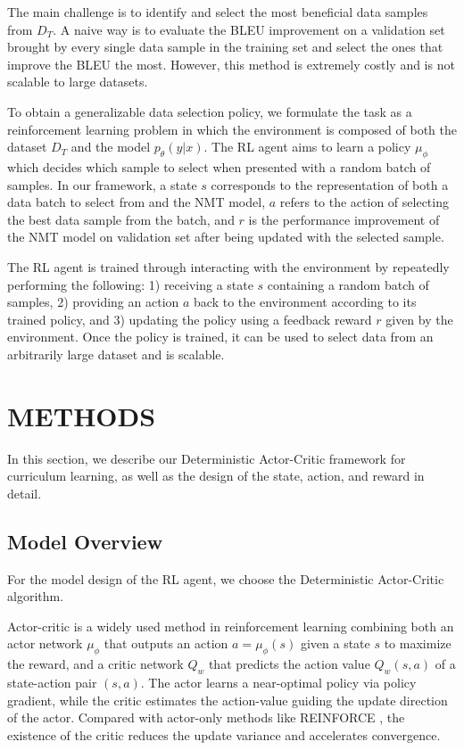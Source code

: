 \documentclass[letterpaper]{article}
\begin{document}
The main challenge is to identify and select the most beneficial data samples from $D_T$.
A naive way is to evaluate the BLEU improvement on a validation set brought by every single data sample in the training set and select the ones that improve the BLEU the most. However, this method is extremely costly and is not scalable to large datasets.

To obtain a generalizable data selection policy, we formulate the task as a reinforcement learning problem in which the environment is composed of both the dataset $D_T$ and the model $p_\theta(y|x)$. The RL agent aims to learn a policy $\mu_\phi$ which decides which sample to select when presented with a random batch of samples. 
In our framework, a state $s$ corresponds to the representation of both a data batch to select from and the NMT model, $a$ refers to the action of selecting the best data sample from the batch, and $r$ is the performance improvement of the NMT model on validation set after being updated with the selected sample. 

The RL agent is trained through interacting with the environment by repeatedly performing the following:
1) receiving a state $s$ containing a random batch of samples, 2) providing an action $a$ back to the environment according to its trained policy, and 3) updating the policy using a feedback reward $r$ given by the environment. Once the policy is trained, it can be used to select data from an arbitrarily large dataset and is scalable.  


\section{METHODS}
\label{sec:model}

In this section, we describe our Deterministic Actor-Critic framework for curriculum learning, as well as the design of the state, action, and reward in detail.

\subsection{Model Overview}

For the model design of the RL agent, we choose the Deterministic Actor-Critic algorithm.

Actor-critic \cite{konda2000actor} is a widely used method in reinforcement learning combining both an actor network $\mu_\phi$ that outputs an action $a=\mu_\phi(s)$ given a state $s$ to maximize the reward, and a critic network $Q_w$ that predicts the action value $Q_w(s,a)$ of a state-action pair $(s,a)$. The actor learns a near-optimal policy via policy gradient, while the critic estimates the action-value guiding the update direction of the actor. Compared with actor-only methods like REINFORCE \cite{williams1992simple}, the existence of the critic reduces the update variance and accelerates convergence.
\end{document}
